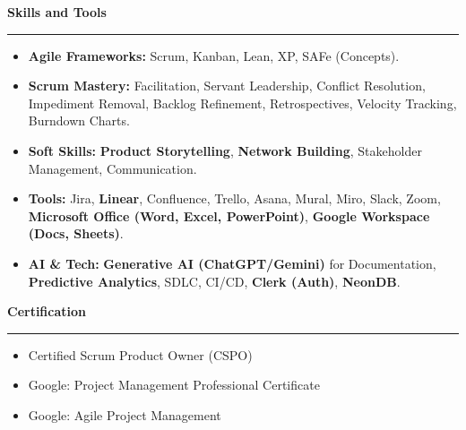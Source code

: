 \documentclass[9pt,letterpaper]{article} %
\newenvironment{rSection}[1]{ %
  \sectionskip
 \textbf{\Large #1} %
  \sectionlineskip
  \hrule %
  \begin{list}{}{ %
    \setlength{\leftmargin}{-0em} %
  }
  \item[]
}{
  \end{list}
}
\def\sectionlineskip{\smallskip} %
\def\sectionskip{} %
\begin{document}
\begin{rSection}{Skills and Tools}
\item[] \vspace{-0.5em}
\begin{itemize}[left=-1.5em, labelsep=.1cm, labelwidth=.2cm, itemsep=0.0em]
    \item \textbf{Agile Frameworks:} Scrum, Kanban, Lean, XP, SAFe (Concepts).
    \item \textbf{Scrum Mastery:} Facilitation, Servant Leadership, Conflict Resolution, Impediment Removal, Backlog Refinement, Retrospectives, Velocity Tracking, Burndown Charts.
    \item \textbf{Soft Skills:} \textbf{Product Storytelling}, \textbf{Network Building}, Stakeholder Management, Communication.
    \item \textbf{Tools:} Jira, \textbf{Linear}, Confluence, Trello, Asana, Mural, Miro, Slack, Zoom, \textbf{Microsoft Office (Word, Excel, PowerPoint)}, \textbf{Google Workspace (Docs, Sheets)}.
    \item \textbf{AI \& Tech:} \textbf{Generative AI (ChatGPT/Gemini)} for Documentation, \textbf{Predictive Analytics}, SDLC, CI/CD, \textbf{Clerk (Auth)}, \textbf{NeonDB}.
\end{itemize}
\end{rSection}

\begin{rSection}{Certification}
\item[] \vspace{-1em}
\begin{itemize}[left=-1.5em, labelsep=.1cm, labelwidth=.2cm, itemsep=0.0em]
\item Certified Scrum Product Owner (CSPO)
\item Google: Project Management Professional Certificate
\item Google: Agile Project Management 
\end{itemize}
\end{rSection}
\end{document}
